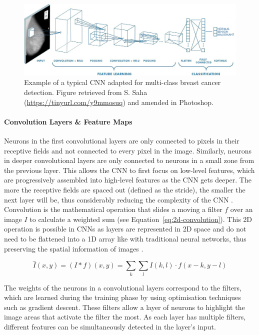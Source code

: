 \begin{figure}[ht]
\centerline{\includegraphics[width=\textwidth]{figures/litsurvey/CNN example.png}}
\caption{\label{fig:litsurvey-CNN-example}Example of a typical CNN adapted for multi-class breast cancer detection. Figure retrieved from S. Saha (\url{https://tinyurl.com/y9mmosuq}) and amended in Photoshop.}
\end{figure}

\paragraph{Convolution Layers \& Feature Maps}

Neurons in the first convolutional layers are only connected to pixels in their receptive fields and not connected to every pixel in the image. Similarly, neurons in deeper convolutional layers are only connected to neurons in a small zone from the previous layer. This allows the CNN to first focus on low-level features, which are progressively assembled into high-level features as the CNN gets deeper. The more the receptive fields are spaced out (defined as the stride), the smaller the next layer will be, thus considerably reducing the complexity of the CNN \citep{Geron2019}. Convolution is the mathematical operation that slides a moving a filter $f$ over an image $I$ to calculate a weighted sum (see Equation~\ref{eq:2d-convolution}). This 2D operation is possible in CNNs as layers are represented in 2D space and do not need to be flattened into a 1D array like with traditional neural networks, thus preserving the spatial information of images \citep{szeliski2010computer}.

\begin{equation}
\label{eq:2d-convolution}
    \hat{I}(x,y)=(I*f)(x,y)=\sum_{k}\sum_{l}I(k,l)\cdot f(x-k, y-l)
\end{equation}

The weights of the neurons in a convolutional layers correspond to the filters, which are learned during the training phase by using optimisation techniques such as gradient descent. These filters allow a layer of neurons to highlight the image areas that activate the filter the most. As each layer has multiple filters, different features can be simultaneously detected in the layer's input.\\

